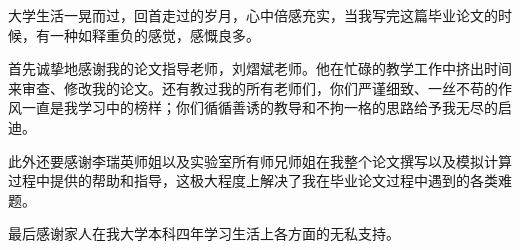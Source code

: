 \begin{thankpage}
\par{大学生活一晃而过，回首走过的岁月，心中倍感充实，当我写完这篇毕业论文的时候，有一种如释重负的感觉，感慨良多。}
\par{首先诚挚地感谢我的论文指导老师，刘熠斌老师。他在忙碌的教学工作中挤出时间来审查、修改我的论文。还有教过我的所有老师们，你们严谨细致、一丝不苟的作风一直是我学习中的榜样；你们循循善诱的教导和不拘一格的思路给予我无尽的启迪。}
\par{此外还要感谢李瑞英师姐以及实验室所有师兄师姐在我整个论文撰写以及模拟计算过程中提供的帮助和指导，这极大程度上解决了我在毕业论文过程中遇到的各类难题。}
\par{最后感谢家人在我大学本科四年学习生活上各方面的无私支持。}

\end{thankpage}
